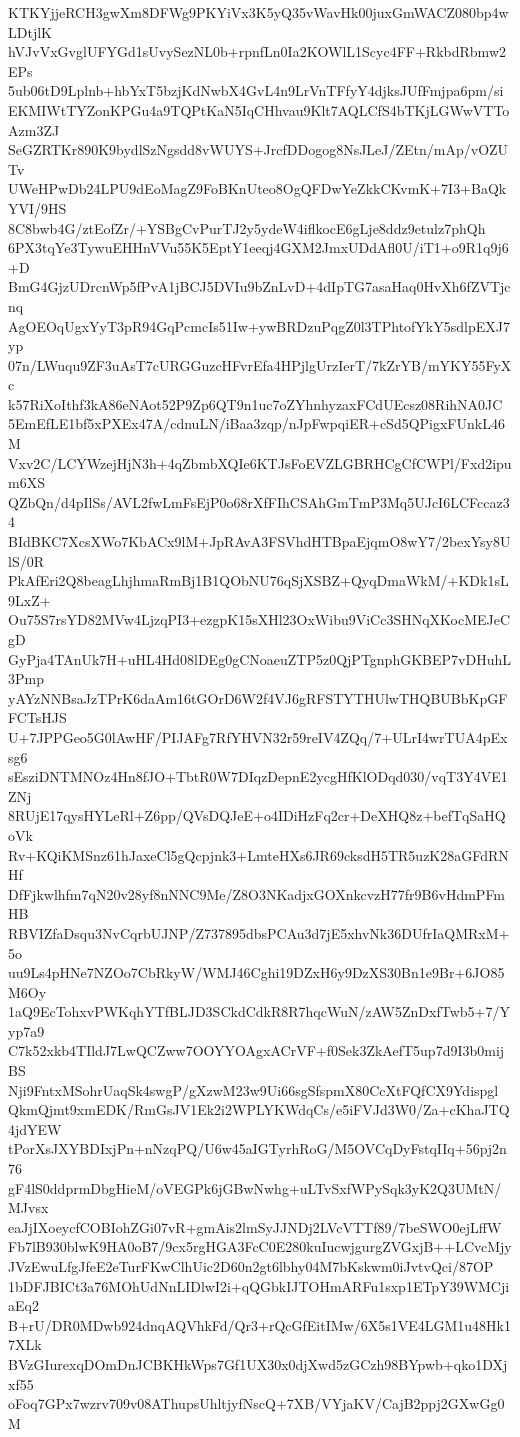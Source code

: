KTKYjjeRCH3gwXm8DFWg9PKYiVx3K5yQ35vWavHk00juxGmWACZ080bp4wLDtjlK
hVJvVxGvglUFYGd1sUvySezNL0b+rpnfLn0Ia2KOWlL1Scyc4FF+RkbdRbmw2EPs
5ub06tD9Lplnb+hbYxT5bzjKdNwbX4GvL4n9LrVnTFfyY4djksJUfFmjpa6pm/si
EKMIWtTYZonKPGu4a9TQPtKaN5IqCHhvau9Klt7AQLCfS4bTKjLGWwVTToAzm3ZJ
SeGZRTKr890K9bydlSzNgsdd8vWUYS+JrcfDDogog8NsJLeJ/ZEtn/mAp/vOZUTv
UWeHPwDb24LPU9dEoMagZ9FoBKnUteo8OgQFDwYeZkkCKvmK+7I3+BaQkYVI/9HS
8C8bwb4G/ztEofZr/+YSBgCvPurTJ2y5ydeW4iflkocE6gLje8ddz9etulz7phQh
6PX3tqYe3TywuEHHnVVu55K5EptY1eeqj4GXM2JmxUDdAfl0U/iT1+o9R1q9j6+D
BmG4GjzUDrcnWp5fPvA1jBCJ5DVIu9bZnLvD+4dIpTG7asaHaq0HvXh6fZVTjcnq
AgOEOqUgxYyT3pR94GqPcmcIs51Iw+ywBRDzuPqgZ0l3TPhtofYkY5sdlpEXJ7yp
07n/LWuqu9ZF3uAsT7cURGGuzcHFvrEfa4HPjlgUrzIerT/7kZrYB/mYKY55FyXc
k57RiXoIthf3kA86eNAot52P9Zp6QT9n1uc7oZYhnhyzaxFCdUEcsz08RihNA0JC
5EmEfLE1bf5xPXEx47A/cdnuLN/iBaa3zqp/nJpFwpqiER+cSd5QPigxFUnkL46M
Vxv2C/LCYWzejHjN3h+4qZbmbXQIe6KTJsFoEVZLGBRHCgCfCWPl/Fxd2ipum6XS
QZbQn/d4pIlSs/AVL2fwLmFsEjP0o68rXfFIhCSAhGmTmP3Mq5UJcI6LCFccaz34
BIdBKC7XcsXWo7KbACx9lM+JpRAvA3FSVhdHTBpaEjqmO8wY7/2bexYsy8UlS/0R
PkAfEri2Q8beagLhjhmaRmBj1B1QObNU76qSjXSBZ+QyqDmaWkM/+KDk1sL9LxZ+
Ou75S7rsYD82MVw4LjzqPI3+ezgpK15sXHl23OxWibu9ViCc3SHNqXKocMEJeCgD
GyPja4TAnUk7H+uHL4Hd08lDEg0gCNoaeuZTP5z0QjPTgnphGKBEP7vDHuhL3Pmp
yAYzNNBsaJzTPrK6daAm16tGOrD6W2f4VJ6gRFSTYTHUlwTHQBUBbKpGFFCTsHJS
U+7JPPGeo5G0lAwHF/PIJAFg7RfYHVN32r59reIV4ZQq/7+ULrI4wrTUA4pExsg6
sEsziDNTMNOz4Hn8fJO+TbtR0W7DIqzDepnE2ycgHfKlODqd030/vqT3Y4VE1ZNj
8RUjE17qysHYLeRl+Z6pp/QVsDQJeE+o4IDiHzFq2cr+DeXHQ8z+befTqSaHQoVk
Rv+KQiKMSnz61hJaxeCl5gQcpjnk3+LmteHXs6JR69cksdH5TR5uzK28aGFdRNHf
DfFjkwlhfm7qN20v28yf8nNNC9Me/Z8O3NKadjxGOXnkcvzH77fr9B6vHdmPFmHB
RBVIZfaDsqu3NvCqrbUJNP/Z737895dbsPCAu3d7jE5xhvNk36DUfrIaQMRxM+5o
uu9Ls4pHNe7NZOo7CbRkyW/WMJ46Cghi19DZxH6y9DzXS30Bn1e9Br+6JO85M6Oy
1aQ9EcTohxvPWKqhYTfBLJD3SCkdCdkR8R7hqcWuN/zAW5ZnDxfTwb5+7/Yyp7a9
C7k52xkb4TIldJ7LwQCZww7OOYYOAgxACrVF+f0Sek3ZkAefT5up7d9I3b0mijBS
Nji9FntxMSohrUaqSk4swgP/gXzwM23w9Ui66sgSfspmX80CcXtFQfCX9Ydispgl
QkmQjmt9xmEDK/RmGsJV1Ek2i2WPLYKWdqCs/e5iFVJd3W0/Za+cKhaJTQ4jdYEW
tPorXsJXYBDIxjPn+nNzqPQ/U6w45aIGTyrhRoG/M5OVCqDyFstqIIq+56pj2n76
gF4lS0ddprmDbgHieM/oVEGPk6jGBwNwhg+uLTvSxfWPySqk3yK2Q3UMtN/MJvsx
eaJjIXoeycfCOBIohZGi07vR+gmAis2lmSyJJNDj2LVcVTTf89/7beSWO0ejLffW
Fb7lB930blwK9HA0oB7/9cx5rgHGA3FcC0E280kuIucwjgurgZVGxjB++LCvcMjy
JVzEwuLfgJfeE2eTurFKwClhUic2D60n2gt6lbhy04M7bKskwm0iJvtvQci/87OP
1bDFJBICt3a76MOhUdNnLIDlwI2i+qQGbkIJTOHmARFu1sxp1ETpY39WMCjiaEq2
B+rU/DR0MDwb924dnqAQVhkFd/Qr3+rQcGfEitIMw/6X5s1VE4LGM1u48Hk17XLk
BVzGIurexqDOmDnJCBKHkWps7Gf1UX30x0djXwd5zGCzh98BYpwb+qko1DXjxf55
oFoq7GPx7wzrv709v08AThupsUhltjyfNscQ+7XB/VYjaKV/CajB2ppj2GXwGg0M

